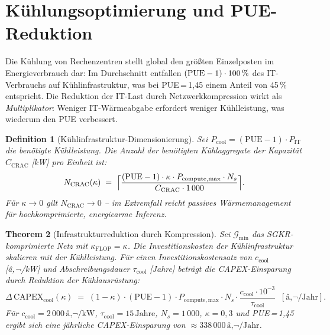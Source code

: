 ﻿\documentclass[12pt, a4paper, openany]{report}
\newtheorem{theorem}{Theorem}[chapter]
\newtheorem{definition}[theorem]{Definition}
\newcommand{\calG}{\mathcal{G}}
\begin{document}
\section{Kühlungsoptimierung und PUE-Reduktion}
\label{sec:cooling}

Die Kühlung von Rechenzentren stellt global den größten Einzelposten im
Energieverbrauch dar: Im Durchschnitt entfallen $({\rm PUE} - 1) \cdot 100\,\%$
des IT-Verbrauchs auf Kühlinfrastruktur, was bei PUE\,=\,1{,}45 einem
Anteil von 45\,\% entspricht.  Die Reduktion der IT-Last durch
Netzwerkkompression wirkt als \emph{Multiplikator}: Weniger IT-Wärmeabgabe
erfordert weniger Kühlleistung, was wiederum den PUE verbessert.

\begin{definition}[Kühlinfrastruktur-Dimensionierung]
\label{def:cooling_dimensioning}
Sei $P_{\mathrm{cool}} = (\mathrm{PUE} - 1) \cdot P_{\mathrm{IT}}$ die
benötigte Kühlleistung.  Die Anzahl der benötigten Kühlaggregate der
Kapazität $C_{\mathrm{CRAC}}$ [kW] pro Einheit ist:
\begin{equation}
  \label{eq:n_crac}
  N_{\mathrm{CRAC}}(\kappa)
  \;=\;
  \Bigl\lceil
    \frac{(\mathrm{PUE}-1) \cdot \kappa \cdot P_{\mathrm{compute,max}} \cdot N_s}
         {C_{\mathrm{CRAC}} \cdot 1\,000}
  \Bigr\rceil.
\end{equation}
Für $\kappa \to 0$ gilt $N_{\mathrm{CRAC}} \to 0$ -- im Extremfall reicht
passives Wärmemanagement für hochkomprimierte, energiearme Inferenz.
\end{definition}

\begin{theorem}[Infrastrukturreduktion durch Kompression]
\label{thm:infra_reduction}
Sei $\calG_{\min}$ das SGKR-komprimierte Netz mit $\kappa_{\mathrm{FLOP}} = \kappa$.
Die Investitionskosten der Kühlinfrastruktur skalieren mit der Kühlleistung.
Für einen Investitionskostensatz von $c_{\mathrm{cool}}$ [â‚¬/kW] und
Abschreibungsdauer $\tau_{\mathrm{cool}}$ [Jahre] beträgt die
CAPEX-Einsparung durch Reduktion der Kühlausrüstung:
\begin{equation}
  \label{eq:capex_cooling}
  \Delta\,\mathrm{CAPEX}_{\mathrm{cool}}(\kappa)
  \;=\;
  (1 - \kappa) \cdot (\mathrm{PUE} - 1) \cdot P_{\mathrm{compute,max}} \cdot N_s
  \cdot \frac{c_{\mathrm{cool}} \cdot 10^{-3}}{\tau_{\mathrm{cool}}}
  \;\;[\text{â‚¬/Jahr}].
\end{equation}
Für $c_{\mathrm{cool}} = 2\,000\,\text{â‚¬/kW}$, $\tau_{\mathrm{cool}} = 15\,\text{Jahre}$,
$N_s = 1\,000$, $\kappa = 0{,}3$ und PUE\,=\,1{,}45 ergibt sich eine
jährliche CAPEX-Einsparung von $\approx 338\,000\,\text{â‚¬/Jahr}$.
\end{theorem}
\end{document}
